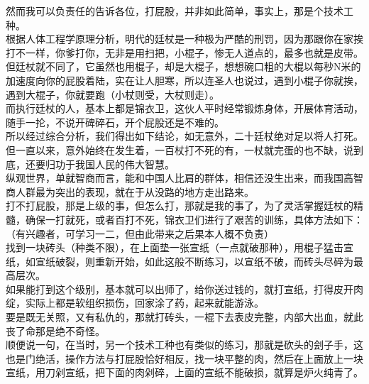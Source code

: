 \begin{multicols}{\theparacolNo}
然而我可以负责任的告诉各位，打屁股，并非如此简单，事实上，那是个技术工种。\\

根据人体工程学原理分析，明代的廷杖是一种极为严酷的刑罚，因为那跟你在家挨打不一样，你爹打你，无非是用扫把，小棍子，惨无人道点的，最多也就是皮带。\\

但廷杖就不同了，它虽然也用棍子，却是大棍子，想想碗口粗的大棍以每秒N米的加速度向你的屁股着陆，实在让人胆寒，所以连圣人也说过，遇到小棍子你就挨，遇到大棍子，你就要跑（小杖则受，大杖则走）。\\

而执行廷杖的人，基本上都是锦衣卫，这伙人平时经常锻炼身体，开展体育活动，随手一抡，不说开碑碎石，开个屁股还是不难的。\\

所以经过综合分析，我们得出如下结论，如无意外，二十廷杖绝对足以将人打死。\\

但一直以来，意外始终在发生着，一百杖打不死的有，一杖就完蛋的也不缺，说到底，还要归功于我国人民的伟大智慧。\\

纵观世界，单就智商而言，能和中国人比肩的群体，相信还没生出来，而我国高智商人群最为突出的表现，就在于从没路的地方走出路来。\\

打不打屁股，那是上级的事，但怎么打，那就是我的事了，为了灵活掌握廷杖的精髓，确保一打就死，或者百打不死，锦衣卫们进行了艰苦的训练，具体方法如下：（有兴趣者，可学习一二，但由此带来之后果本人概不负责）\\

找到一块砖头（种类不限），在上面垫一张宣纸（一点就破那种），用棍子猛击宣纸，如宣纸破裂，则重新开始，如此这般不断练习，以宣纸不破，而砖头尽碎为最高层次。\\

如果能打到这个级别，基本就可以出师了，给你送过钱的，就打宣纸，打得皮开肉绽，实际上都是软组织损伤，回家涂了药，起来就能游泳。\\

要是既无关照，又有私仇的，那就打砖头，一棍下去表皮完整，内部大出血，就此丧了命那是绝不奇怪。\\

顺便说一句，在当时，另一个技术工种也有类似的练习，那就是砍头的刽子手，这也是门绝活，操作方法与打屁股恰好相反，找一块平整的肉，然后在上面放上一块宣纸，用刀剁宣纸，把下面的肉剁碎，上面的宣纸不能破损，就算是炉火纯青了。\\


\end{multicols}
